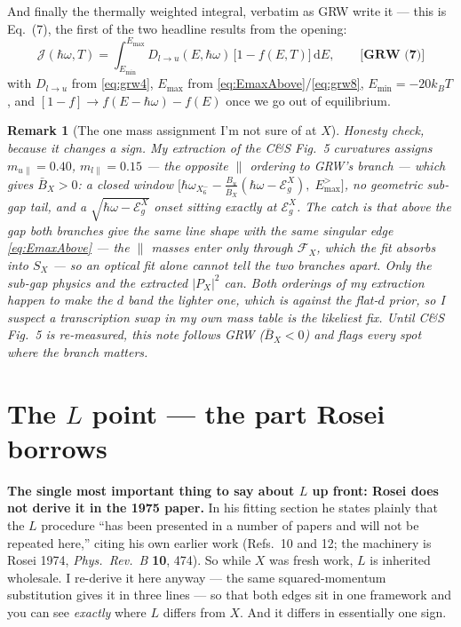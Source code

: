 \documentclass[11pt,a4paper]{article}
\numberwithin{equation}{section}
\newcommand{\hw}{\hbar\omega}
\newcommand{\EgX}{\mathcal{E}_g^{X}}
\newcommand{\cF}{\mathcal{F}}
\newcommand{\cJ}{\mathcal{J}}%
\newcommand{\BX}{\bar{B}_X}
\newcommand{\dd}{\mathrm{d}}
\newcommand{\wXsix}{\hbar\omega_{X_6^-}}
\newcommand{\grweq}[1]{\textbf{[GRW~(#1)]}}
\newtheorem{remark}{Remark}[section]
\begin{document}
And finally the thermally weighted integral, verbatim as GRW write it
--- this is Eq.~(7), the first of the two headline results from the
opening:
\begin{equation}
\cJ(\hw,T)=\int_{E_{\min}}^{E_{\max}}
D_{l\to u}(E,\hw)\,\bigl[1-f(E,T)\bigr]\,\dd E ,
\qquad\grweq{7}
\label{eq:grw7}
\end{equation}
with $D_{l\to u}$ from \eqref{eq:grw4}, $E_{\max}$ from
\eqref{eq:EmaxAbove}/\eqref{eq:grw8}, $E_{\min}=-20k_BT$, and
$[1-f]\to f(E-\hw)-f(E)$ once we go out of equilibrium.

\begin{remark}[The one mass assignment I'm not sure of at $X$]
\label{rem:massfork}
Honesty check, because it changes a sign. My extraction of the C\&S
Fig.~5 curvatures assigns $m_{u\parallel}=0.40$,
$m_{l\parallel}=0.15$ --- the \emph{opposite} $\parallel$ ordering to
GRW's branch --- which gives $\BX>0$: a \emph{closed} window
$\bigl[\wXsix-\tfrac{B_u}{\BX}(\hw-\EgX),\;E_{\max}^{>}\bigr]$, no
geometric sub-gap tail, and a $\sqrt{\hw-\EgX}$ onset sitting exactly
at $\EgX$. The catch is that \emph{above} the gap both branches give
the \emph{same} line shape with the same singular edge
\eqref{eq:EmaxAbove} --- the $\parallel$ masses enter only through
$\cF_X$, which the fit absorbs into $S_X$ --- so an optical fit alone
\emph{cannot} tell the two branches apart. Only the sub-gap physics
and the extracted $|P_X|^2$ can. Both orderings of my extraction
happen to make the $d$ band the \emph{lighter} one, which is against
the flat-$d$ prior, so I suspect a transcription swap in my own mass
table is the likeliest fix. Until C\&S Fig.~5 is re-measured, this
note follows GRW ($\BX<0$) and flags every spot where the branch
matters.
\end{remark}

\section{The $L$ point --- the part Rosei borrows}\label{sec:L}

\textbf{The single most important thing to say about $L$ up front:
Rosei does not derive it in the 1975 paper.} In his fitting section he
states plainly that the $L$ procedure ``has been presented in a number
of papers and will not be repeated here,'' citing his own earlier work
(Refs.~10 and 12; the machinery is Rosei 1974, \emph{Phys.\ Rev.\ B}
\textbf{10}, 474). So while $X$ was fresh work, $L$ is inherited
wholesale. I re-derive it here anyway --- the same squared-momentum
substitution gives it in three lines --- so that both edges sit in one
framework and you can see \emph{exactly} where $L$ differs from $X$.
And it differs in essentially one sign.
\end{document}
